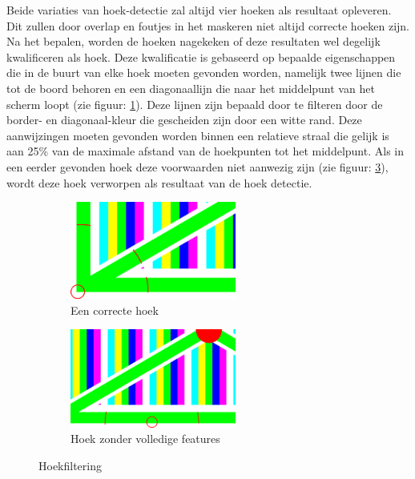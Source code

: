 \noindent
Beide variaties van hoek-detectie zal altijd vier hoeken als resultaat opleveren. Dit zullen door overlap en foutjes in het maskeren niet altijd correcte hoeken zijn. Na het bepalen, worden de hoeken nagekeken of deze resultaten wel degelijk kwalificeren als hoek. Deze kwalificatie is gebaseerd op bepaalde eigenschappen die in de buurt van elke hoek moeten gevonden worden, namelijk twee lijnen die tot de boord behoren en een diagonaallijn die naar het middelpunt van het scherm loopt (zie figuur: \ref{fig:correcte hoek}). Deze lijnen zijn bepaald door te filteren door de border- en diagonaal-kleur die gescheiden zijn door een witte rand. Deze aanwijzingen moeten gevonden worden binnen een relatieve straal die gelijk is aan 25\% van de maximale afstand van de hoekpunten tot het middelpunt. Als in een eerder gevonden hoek deze voorwaarden niet aanwezig zijn (zie figuur: \ref{fig:foute hoek}), wordt deze hoek verworpen als resultaat van de hoek detectie.

\begin{figure}[H] 
\centering
\begin{subfigure}{0.5\textwidth}
\centering
\includegraphics[width=0.6\textwidth]{img/correctCorner.png}
\caption{Een correcte hoek}
\label{fig:correcte hoek}
\end{subfigure}%
\begin{subfigure}{0.5\textwidth}
\centering
\includegraphics[width=0.6\textwidth]{img/notACorner.png}
\caption{Hoek zonder volledige features}
\label{fig:foute hoek}
\end{subfigure}
\caption{Hoekfiltering}
\end{figure}